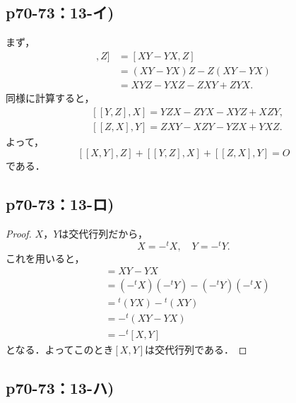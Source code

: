 \documentclass[uplatex,dvipdfmx,a4paper,10pt,fleqn]{jsarticle}
\begin{document}
\newpage 


\subsection*{p70-73：13-イ)}

\begin{tleftbar}
    まず，
\begin{align*} 
    [ [X,Y],Z ] & = [XY-YX,Z] \\
    & = (XY-YX)Z -Z(XY-YX) \\
    & = XYZ -YXZ -ZXY +ZYX.
\end{align*}
同様に計算すると，
\begin{align*} 
    & [[Y,Z],X] = YZX -ZYX -XYZ +XZY, \\
    & [ [Z,X],Y] = ZXY -XZY -YZX +YXZ.
\end{align*} 
よって，
\[
    [[X,Y],Z] +[[Y,Z],X]+[[Z,X],Y]=O
\]
である．
\end{tleftbar}

\subsection*{p70-73：13-ロ)}

\begin{tleftbar}
    \begin{proof}
        $X$，$Y$は交代行列だから，
        \[
          X=- {}^t X ,\quad Y = -{}^t Y .
        \]
        これを用いると，
        \begin{align*} 
            [X,Y] & = XY -YX \\
            & = (-{}^t X) (-{}^t Y) - (-{}^t Y)(-{}^t X) \\
            & = {}^t (YX) - {}^t (XY) \\
            & = -{}^t (XY-YX) \\
            & = -{}^t [X,Y]
        \end{align*} 
        となる．よってこのとき$[X,Y]$は交代行列である．
    \end{proof}
    \end{tleftbar}
\newpage 

    \subsection*{p70-73：13-ハ)}
\end{document}
